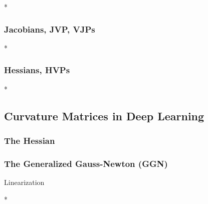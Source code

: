 \switchcolumn[0]*
\subsubsection{Jacobians, JVP, VJPs}


\switchcolumn[0]*
\subsubsection{Hessians, HVPs}


\switchcolumn[0]*
\subsection{Curvature Matrices in Deep Learning}
\subsubsection{The Hessian}

\subsubsection{The Generalized Gauss-Newton (GGN)}
Linearization

\switchcolumn[1]*
\switchcolumn[0]

